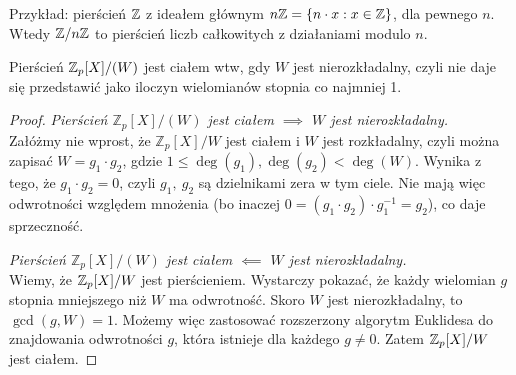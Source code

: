 Przykład: pierścień \( \mathbb{Z} \) z ideałem głównym \( n \integer = \set{n \cdot x : x \in \integer} \), dla pewnego \( n \).
Wtedy \( \mathbb{Z} / n\mathbb{Z} \) to pierścień liczb całkowitych z działaniami modulo \( n \).
\begin{theorem}
	Pierścień \( \mathbb{Z}_p[X]/(W) \) jest ciałem wtw, gdy \( W \) jest nierozkładalny, czyli nie daje się przedstawić jako iloczyn wielomianów stopnia co najmniej 1.
\end{theorem}
\begin{proof}
	\textit{Pierścień \( \mathbb{Z}_p[X]/(W) \) jest ciałem \( \implies \) \( W \) jest nierozkładalny.} \\
	Załóżmy nie wprost, że \( \mathbb{Z}_p[X]/W \) jest ciałem i \( W \) jest rozkładalny, czyli można zapisać \linebreak \( W = g_1 \cdot g_2 \), gdzie \( 1 \leq \deg(g_1), \deg(g_2) < \deg(W) \).
	Wynika z tego, że \( g_1 \cdot g_2 = 0 \), czyli \( g_1, \ g_2 \) są dzielnikami zera w tym ciele. Nie mają więc odwrotności względem mnożenia (bo inaczej \(0 = (g_1 \cdot g_2) \cdot g_1^{-1} = g_2\)), co daje sprzeczność.

	\textit{Pierścień \( \mathbb{Z}_p[X]/(W) \) jest ciałem \( \impliedby \) \( W \) jest nierozkładalny.} \\
	Wiemy, że \( \mathbb{Z}_p[X]/W \) jest pierścieniem. Wystarczy pokazać, że każdy wielomian \( g \) stopnia mniejszego niż \( W \) ma odwrotność.
	Skoro \( W \) jest nierozkładalny, to \( \gcd(g, W) = 1 \). Możemy więc zastosować rozszerzony algorytm Euklidesa do znajdowania odwrotności \( g \), która istnieje dla każdego \( g \neq 0 \). Zatem \( \mathbb{Z}_p[X]/W \) jest ciałem.
\end{proof}